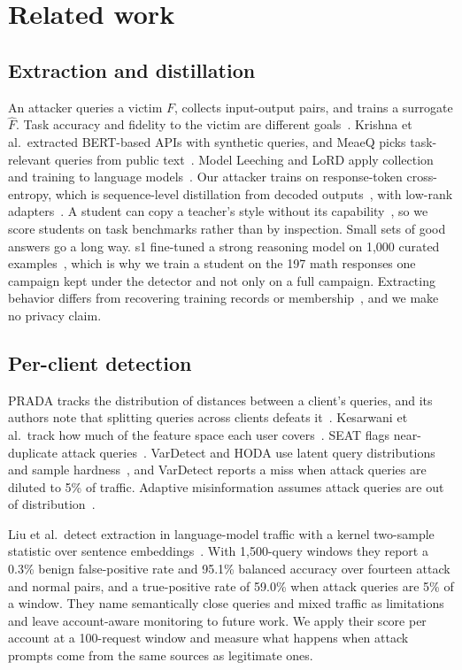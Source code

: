 \documentclass[journal]{IEEEtran}
\begin{document}
\section{Related work}
\label{sec:related}
\subsection{Extraction and distillation}
An attacker queries a victim $F$, collects input-output pairs, and trains a surrogate $\widehat F$. Task accuracy and fidelity to the victim are different goals~\cite{jagielski2020high}. Krishna et al.\ extracted BERT-based APIs with synthetic queries, and MeaeQ picks task-relevant queries from public text~\cite{krishna2020thieves,dai2023meaeq}. Model Leeching and LoRD apply collection and training to language models~\cite{birch2023leeching,liang2025lord}. Our attacker trains on response-token cross-entropy, which is sequence-level distillation from decoded outputs~\cite{kim2016sequence}, with low-rank adapters~\cite{hu2022lora,dettmers2023qlora}. A student can copy a teacher's style without its capability~\cite{gudibande2024false}, so we score students on task benchmarks rather than by inspection. Small sets of good answers go a long way. s1 fine-tuned a strong reasoning model on 1,000 curated examples~\cite{muennighoff2025s1}, which is why we train a student on the 197 math responses one campaign kept under the detector and not only on a full campaign. Extracting behavior differs from recovering training records or membership~\cite{carlini2021extracting,shokri2017membership}, and we make no privacy claim.

\subsection{Per-client detection}
PRADA tracks the distribution of distances between a client's queries, and its authors note that splitting queries across clients defeats it~\cite{juuti2019prada}. Kesarwani et al.\ track how much of the feature space each user covers~\cite{kesarwani2018warning}. SEAT flags near-duplicate attack queries~\cite{zhang2021seat}. VarDetect and HODA use latent query distributions and sample hardness~\cite{pal2021stateful,sadeghzadeh2022hoda}, and VarDetect reports a miss when attack queries are diluted to 5\% of traffic. Adaptive misinformation assumes attack queries are out of distribution~\cite{kariyappa2020adaptive}.

Liu et al.\ detect extraction in language-model traffic with a kernel two-sample statistic over sentence embeddings~\cite{liu2026detector,mmd2026artifact}. With 1,500-query windows they report a 0.3\% benign false-positive rate and 95.1\% balanced accuracy over fourteen attack and normal pairs, and a true-positive rate of 59.0\% when attack queries are 5\% of a window. They name semantically close queries and mixed traffic as limitations and leave account-aware monitoring to future work. We apply their score per account at a 100-request window and measure what happens when attack prompts come from the same sources as legitimate ones.
\end{document}
